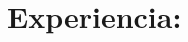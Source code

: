 \documentclass[letterpaper]{twentysecondcv} %
\begin{document}
\begin{comment}
\section{Publications}

\begin{twentyshort} %
	\twentyitemshort{1865}{Chapter One, Down the Rabbit Hole.}
	\twentyitemshort{1865}{Chapter Two, The Pool of Tears.}
	\twentyitemshort{1865}{Chapter Three,  The Caucus Race and a Long Tale.}
	\twentyitemshort{1865}{Chapter Four,  The Rabbit Sends a Little Bill.}
	\twentyitemshort{1865}{Chapter Five,  Advice from a Caterpillar.}
\end{twentyshort}


\section{Awards}

\begin{twentyshort} %
	\twentyitemshort{1987}{All-Time Best Fantasy Novel.}
	\twentyitemshort{1998}{All-Time Best Fantasy Novel before 1990.}
\end{twentyshort}
\end{comment}

\section{Experiencia:}
\end{document}
